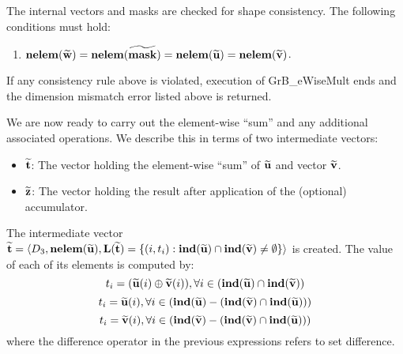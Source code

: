 The internal vectors and masks are checked for shape consistency. The following 
conditions must hold:
\begin{enumerate}
	\item $\bold{nelem}({\bf \widetilde{w}}) = \bold{nelem}({\bf \widetilde{mask}})
    = \bold{nelem}({\bf \widetilde{u}}) = \bold{nelem}({\bf \widetilde{v}})$.
\end{enumerate}
If any consistency rule above is violated, execution of {\sf GrB\_eWiseMult} ends and 
the dimension mismatch error listed above is returned.

We are now ready to carry out the element-wise ``sum'' and any additional 
associated operations.  We describe this in terms of two intermediate vectors:
\begin{itemize}
	\item ${\bf \widetilde{t}}$: The vector holding the element-wise ``sum'' of
    ${\bf \widetilde{u}}$ and vector ${\bf \widetilde{v}}$.
	\item ${\bf \widetilde{z}}$: The vector holding the result after 
    application of the (optional) accumulator.
\end{itemize}

The intermediate vector ${\bf \widetilde{t}} = \langle
D_3, \bold{nelem}({\bf \widetilde{u}}),
\bold{L}({\bf \widetilde{t}}) =
\{(i,t_i) : \bold{ind}({\bf \widetilde{u}}) \cap 
\bold{ind}({\bf \widetilde{v}})
 \neq \emptyset \} \rangle$
is created.  The value of each of its elements is computed by:
\[t_i = ({\bf \widetilde{u}}(i) \oplus {\bf \widetilde{v}}(i)), \forall i \in (\bold{ind}({\bf \widetilde{u}}) \cap \bold{ind}({\bf \widetilde{v}}))\]
\[t_i = {\bf \widetilde{u}}(i), \forall i \in (\bold{ind}({\bf \widetilde{u}}) - (\bold{ind}({\bf \widetilde{v}}) \cap \bold{ind}({\bf \widetilde{u}})))\]
\[t_i = {\bf \widetilde{v}}(i), \forall i \in (\bold{ind}({\bf \widetilde{v}}) - (\bold{ind}({\bf \widetilde{v}}) \cap \bold{ind}({\bf \widetilde{u}})))\]
where the difference operator in the previous expressions refers to set difference.

